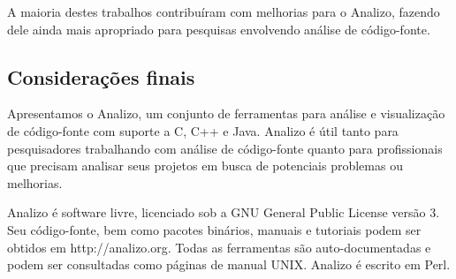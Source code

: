 A maioria destes trabalhos contribuíram com melhorias para o Analizo, fazendo
dele ainda mais apropriado para pesquisas envolvendo análise de código-fonte.

\subsection{Considerações finais}

Apresentamos o Analizo, um conjunto de ferramentas para análise e
visualização de código-fonte com suporte a C, C++ e Java. Analizo é útil tanto
para pesquisadores trabalhando com análise de código-fonte quanto para
profissionais que precisam analisar seus projetos em busca de
potenciais problemas ou melhorias.

Analizo é software livre, licenciado sob a GNU General Public License versão 3.
Seu código-fonte, bem como pacotes binários, manuais e tutoriais podem ser
obtidos em http://analizo.org. Todas as ferramentas são auto-documentadas e
podem ser consultadas como páginas de manual UNIX. Analizo é escrito em Perl.

